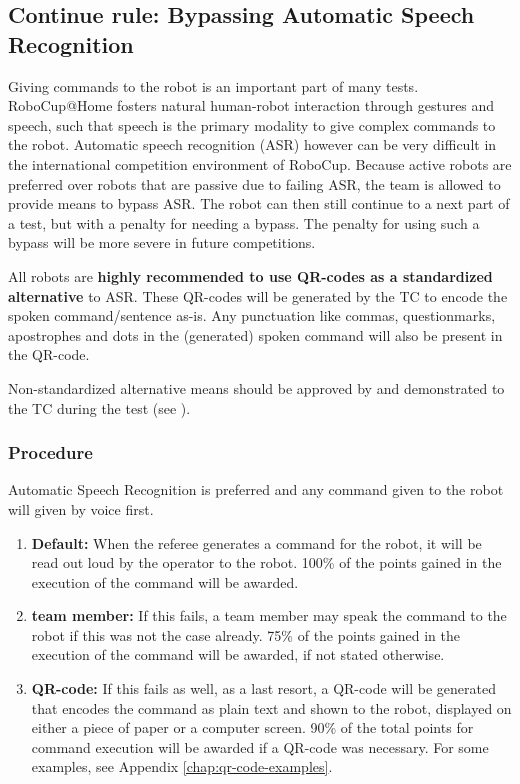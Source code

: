 \subsection{Continue rule: Bypassing Automatic Speech Recognition}
\label{rule:asrcontinue}

Giving commands to the robot is an important part of many tests. 
RoboCup@Home fosters natural human-robot interaction through gestures and speech, such that speech is the primary modality to give complex commands to the robot. 
Automatic speech recognition (ASR) however can be very difficult in the international competition environment of RoboCup. 
Because active robots are preferred over robots that are passive due to failing ASR, 
  the team is allowed to provide means to bypass ASR. 
The robot can then still continue to a next part of a test, but with a penalty for needing a bypass. 
The penalty for using such a bypass will be more severe in future competitions.

All robots are \textbf{highly recommended to use QR-codes as a standardized alternative} to ASR. These QR-codes will be generated by the TC to encode the spoken command/sentence as-is. 
Any punctuation like commas, questionmarks, apostrophes and dots in the (generated) spoken command will also be present in the QR-code. 

Non-standardized alternative means should be
  approved by and demonstrated to the TC during the  test (see ).

\subsubsection{Procedure}
Automatic Speech Recognition is preferred and any command given to the robot will given by voice first.
\begin{enumerate}
\item \textbf{Default:} When the referee generates a command for the robot, it will be read out loud by the operator to the robot. 100\% of the points gained in the execution of the command will be awarded.
\item \textbf{team member: } If this fails, a team member may speak the command to the robot if this was not the case already.  75\% of the points gained in the execution of the command will be awarded, if not stated otherwise.
\item \textbf{QR-code:} If this fails as well, as a last resort, a QR-code will be generated that encodes the command as plain text and shown to the robot, displayed on either a piece of paper or a computer screen. 90\% of the total points for command execution will be awarded if a QR-code was necessary. 
      For some examples, see Appendix \ref{chap:qr-code-examples}.
\end{enumerate}

